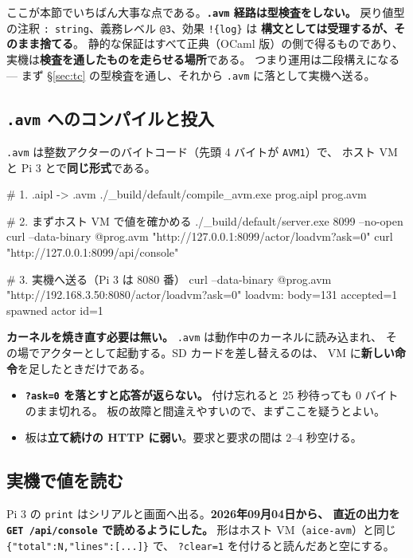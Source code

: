\documentclass[11pt,a4paper]{ltjsarticle}
\begin{document}
ここが本節でいちばん大事な点である。\textbf{\texttt{.avm} 経路は型検査をしない。}
戻り値型の注釈 \texttt{: string}、義務レベル \texttt{@3}、効果 \texttt{!\{log\}} は
\textbf{構文としては受理するが、そのまま捨てる}。
静的な保証はすべて正典（OCaml 版）の側で得るものであり、
実機は\textbf{検査を通したものを走らせる場所}である。
つまり運用は二段構えになる ---
まず \S\ref{sec:tc} の型検査を通し、それから \texttt{.avm} に落として実機へ送る。

\subsection{\texttt{.avm} へのコンパイルと投入}

\texttt{.avm} は整数アクターのバイトコード（先頭 4 バイトが \texttt{AVM1}）で、
ホスト VM と Pi 3 とで\textbf{同じ形式}である。

\begin{term}
# 1. .aipl -> .avm
./_build/default/compile_avm.exe prog.aipl prog.avm

# 2. まずホスト VM で値を確かめる
./_build/default/server.exe 8099 --no-open
curl --data-binary @prog.avm "http://127.0.0.1:8099/actor/loadvm?ask=0"
curl "http://127.0.0.1:8099/api/console"

# 3. 実機へ送る（Pi 3 は 8080 番）
curl --data-binary @prog.avm "http://192.168.3.50:8080/actor/loadvm?ask=0"
loadvm: body=131 accepted=1 spawned actor id=1
\end{term}

\textbf{カーネルを焼き直す必要は無い。} \texttt{.avm} は動作中のカーネルに読み込まれ、
その場でアクターとして起動する。SD カードを差し替えるのは、
VM に\textbf{新しい命令}を足したときだけである。

\begin{itemize}
\item \textbf{\texttt{?ask=0} を落とすと応答が返らない。}
  付け忘れると 25 秒待っても 0 バイトのまま切れる。
  板の故障と間違えやすいので、まずここを疑うとよい。
\item 板は\textbf{立て続けの HTTP に弱い}。要求と要求の間は 2--4 秒空ける。
\end{itemize}

\subsection{実機で値を読む}
\label{sec:pi3-console}

Pi 3 の \texttt{print} はシリアルと画面へ出る。\textbf{2026年09月04日から、
直近の出力を \texttt{GET /api/console} で読めるようにした。}
形はホスト VM（\texttt{aice-avm}）と同じ \texttt{\{"total":N,"lines":[...]\}} で、
\texttt{?clear=1} を付けると読んだあと空にする。
\end{document}
